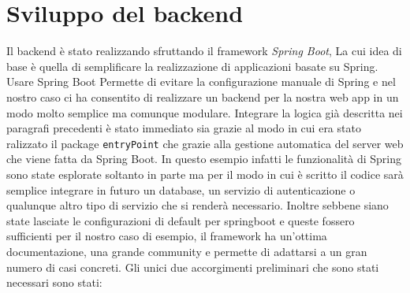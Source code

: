 \section{Sviluppo del backend}
Il backend è stato realizzando sfruttando il framework \emph{Spring Boot}\cite{springboot}, La cui idea di base è quella di semplificare la realizzazione di applicazioni basate su Spring\cite{spring}. Usare Spring Boot Permette di evitare la configurazione manuale di Spring e nel nostro caso ci ha consentito di realizzare un backend per la nostra web app in un modo molto semplice ma comunque modulare. Integrare la logica già descritta nei paragrafi precedenti è stato immediato sia grazie al modo in cui era stato ralizzato il package \texttt{entryPoint} che grazie alla gestione automatica del server web che viene fatta da Spring Boot. In questo esempio infatti le funzionalità di Spring sono state esplorate soltanto in parte ma per il modo in cui è scritto il codice sarà semplice integrare in futuro un database, un servizio di autenticazione o qualunque altro tipo di servizio che si renderà necessario. Inoltre sebbene siano state lasciate le configurazioni di default per springboot e queste fossero sufficienti per il nostro caso di esempio, il framework ha un'ottima documentazione, una grande community e permette di adattarsi a un gran numero di casi concreti.\medbreak
Gli unici due accorgimenti preliminari che sono stati necessari sono stati:
